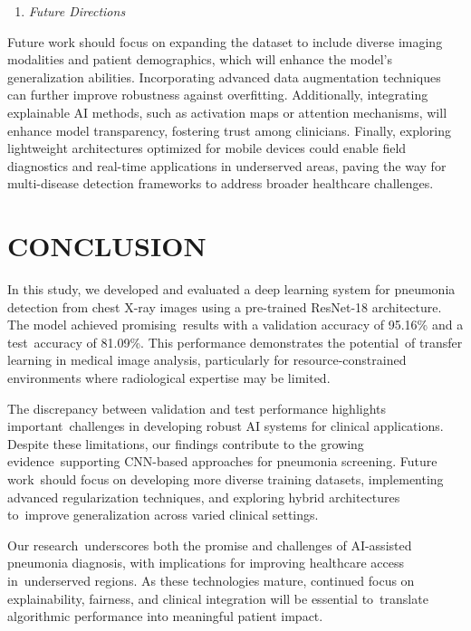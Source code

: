 \documentclass[
  twocolumn,
  10pt,
  a4paper,
  journal
]{IEEEtran}
\begin{document}
\begin{enumerate}
\def\labelenumi{\Alph{enumi}.}
\setcounter{enumi}{3}
\item
  \emph{Future Directions}
\end{enumerate}

Future work should focus on expanding the dataset to include diverse
imaging modalities and patient demographics, which will enhance the
model's generalization abilities. Incorporating advanced data
augmentation techniques can further improve robustness against
overfitting. Additionally, integrating explainable AI methods, such as
activation maps or attention mechanisms, will enhance model
transparency, fostering trust among clinicians. Finally, exploring
lightweight architectures optimized for mobile devices could enable
field diagnostics and real-time applications in underserved areas,
paving the way for multi-disease detection frameworks to address broader
healthcare challenges.

\section{CONCLUSION}

In this study, we developed and evaluated a deep learning system for
pneumonia detection from chest X-ray images using a pre-trained
ResNet-18 architecture. The model achieved promising~results with a
validation accuracy of 95.16\% and a test~accuracy of 81.09\%. This
performance demonstrates the potential~of transfer learning in medical
image analysis, particularly for resource-constrained environments where
radiological expertise may be limited.

The discrepancy between validation and test performance highlights
important~challenges in developing robust AI systems for clinical
applications. Despite these limitations, our findings contribute to the
growing evidence~supporting CNN-based approaches for pneumonia
screening. Future work~should focus on developing more diverse training
datasets, implementing advanced regularization techniques, and exploring
hybrid architectures to~improve generalization across varied clinical
settings.

Our research~underscores both the promise and challenges of AI-assisted
pneumonia diagnosis, with implications for improving healthcare access
in~underserved regions. As these technologies mature, continued focus on
explainability, fairness, and clinical integration will be essential
to~translate algorithmic performance into meaningful patient impact.
\end{document}
